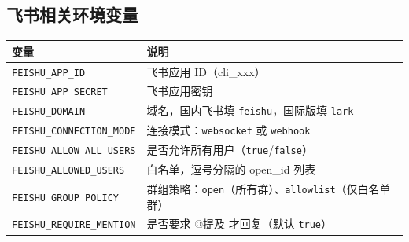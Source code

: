 \subsection{飞书相关环境变量}

\begin{longtable}{ll}
\toprule
\textbf{变量} & \textbf{说明} \\
\midrule
\endhead
\texttt{FEISHU\_APP\_ID} & 飞书应用 ID（cli\_xxx） \\
\texttt{FEISHU\_APP\_SECRET} & 飞书应用密钥 \\
\texttt{FEISHU\_DOMAIN} & 域名，国内飞书填 \texttt{feishu}，国际版填 \texttt{lark} \\
\texttt{FEISHU\_CONNECTION\_MODE} & 连接模式：\texttt{websocket} 或 \texttt{webhook} \\
\texttt{FEISHU\_ALLOW\_ALL\_USERS} & 是否允许所有用户（\texttt{true}/\texttt{false}） \\
\texttt{FEISHU\_ALLOWED\_USERS} & 白名单，逗号分隔的 open\_id 列表 \\
\texttt{FEISHU\_GROUP\_POLICY} & 群组策略：\texttt{open}（所有群）、\texttt{allowlist}（仅白名单群） \\
\texttt{FEISHU\_REQUIRE\_MENTION} & 是否要求 @提及 才回复（默认 \texttt{true}） \\
\bottomrule
\end{longtable}
